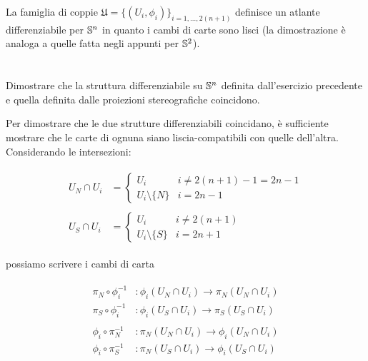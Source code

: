 La famiglia di coppie $ \mathfrak{U} = \{ (U_{i},\phi_{i}) \}_{i=1,\dots,2(n+1)} $ definisce un atlante differenziabile per $ \S^{n} $ in quanto i cambi di carte sono lisci (la dimostrazione è analoga a quelle fatta negli appunti per $ \S^{2} $).

\tocless\section{}\label{es2-2}

\begin{tcolorbox}
	Dimostrare che la struttura differenziabile su $ \S^{n} $ definita dall’esercizio precedente e quella definita dalle proiezioni
	stereografiche coincidono.
\end{tcolorbox}

Per dimostrare che le due strutture differenziabili coincidano, è sufficiente mostrare che le carte di ognuna siano liscia-compatibili con quelle dell'altra.\\
Considerando le intersezioni:

\begin{align}
	\begin{split}
		U_{N} \cap U_{i} &= %
		\begin{cases}
			U_{i} & i \neq 2(n+1)-1 = 2n-1\\
			U_{i} \setminus \{ N \} & i = 2n-1
		\end{cases}\\\\
		U_{S} \cap U_{i} &= %
		\begin{cases}
			U_{i} & i \neq 2(n+1)\\
			U_{i} \setminus \{ S \} & i = 2n+1
		\end{cases}
	\end{split}
\end{align}

possiamo scrivere i cambi di carta

\begin{align}
	\begin{split}
		\pi_{N} \circ \phi_{i}^{-1} &: \phi_{i}(U_{N} \cap U_{i}) \to \pi_{N}(U_{N} \cap U_{i})\\
		\pi_{S} \circ \phi_{i}^{-1} &: \phi_{i}(U_{S} \cap U_{i}) \to \pi_{S}(U_{S} \cap U_{i})\\\\
		\phi_{i} \circ \pi_{N}^{-1} &: \pi_{N}(U_{N} \cap U_{i}) \to \phi_{i}(U_{N} \cap U_{i})\\
		\phi_{i} \circ \pi_{S}^{-1} &: \pi_{N}(U_{S} \cap U_{i}) \to \phi_{i}(U_{S} \cap U_{i})
	\end{split}
\end{align}

